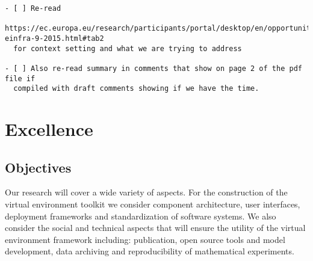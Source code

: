 \documentclass[noworkareas,deliverables,\classoptions]{euproposal}       %
\begin{document}
\begin{proposal}
\begin{draft}
\begin{verbatim}
- [ ] Re-read
  https://ec.europa.eu/research/participants/portal/desktop/en/opportunities/h2020/topics/2144-einfra-9-2015.html#tab2
  for context setting and what we are trying to address

- [ ] Also re-read summary in comments that show on page 2 of the pdf file if
  compiled with draft comments showing if we have the time.
\end{verbatim}
\clearpage
\end{draft}




\section{Excellence}



\subsection{Objectives}
\label{sect:objectives}


Our research will cover a wide variety of aspects. For the
construction of the \TheProject virtual environment toolkit we
consider component architecture, user interfaces, deployment
frameworks and standardization of software systems.  We also consider
the social and technical aspects that will ensure the utility of the
virtual environment framework including: publication, open source
tools and model development, data archiving and reproducibility of
mathematical experiments.


\end{proposal}
\end{document}
